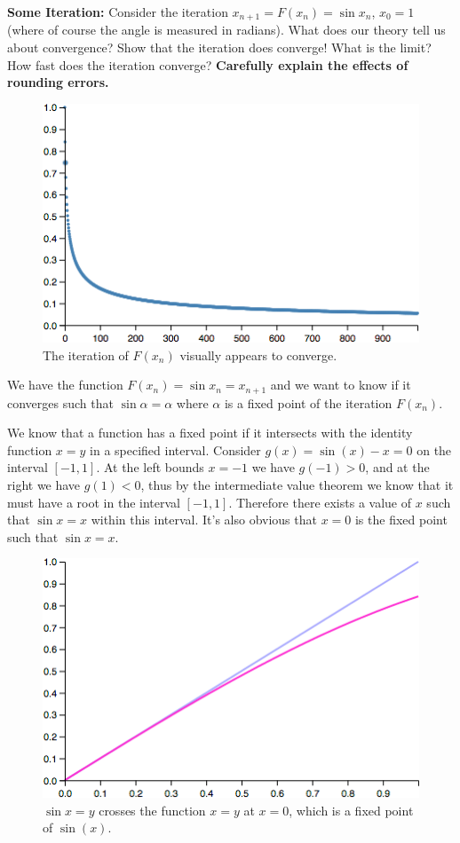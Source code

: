\textbf{Some Iteration:} Consider the iteration $x_{n+1} = F(x_n) = \sin x_n$, $x_0 = 1$ (where of course the angle is measured in radians). What does our theory tell us about convergence? Show that the iteration does converge! What is the limit? How fast does the iteration converge? \textbf{Carefully explain the effects of rounding errors.}

{\color{blue}

\begin{figure}[H]
\centering
\includegraphics[scale=0.65]{convergence-sinx-double.png}
\caption{The iteration of $F(x_n)$ visually appears to converge.}
\end{figure}

We have the function $F(x_n) = \sin x_n = x_{n+1}$ and we want to know if it converges such that $\sin \alpha = \alpha$ where $\alpha$ is a fixed point of the iteration $F(x_n)$.

We know that a function has a fixed point if it intersects with the identity function $x = y$ in a specified interval. Consider $g(x) = \sin(x) - x = 0$ on the interval $[-1, 1]$. At the left bounds $x = -1$ we have $g(-1) > 0$, and at the right we have $g(1) < 0$, thus by the intermediate value theorem we know that it must have a root in the interval $[-1, 1]$. Therefore there exists a value of $x$ such that $\sin x = x$ within this interval. It's also obvious that $x = 0$ is the fixed point such that $\sin x = x$.

\begin{figure}[H]
\centering
\includegraphics[scale=0.65]{sinx-xy-plot.png}
\caption{$\sin x = y$ crosses the function $x = y$ at $x = 0$, which is a fixed point of $\sin(x)$.}
\end{figure}

}
